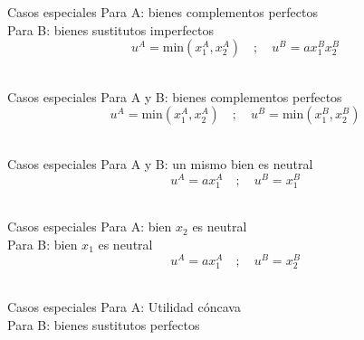 \begin{frame}{Casos especiales}
	Para A: bienes complementos perfectos \\
	Para B: bienes sustitutos imperfectos
		$$u^{A}=\text{min}(x_{1}^{A},x_{2}^{A}) \quad ; \quad u^{B}=ax_{1}^{B}x_{2}^{B}$$\\
			\centering
		
\end{frame}
\begin{frame}{Casos especiales}
	Para A y B: bienes complementos perfectos
	$$u^{A}=\text{min}(x_{1}^{A},x_{2}^{A}) \quad ; \quad u^{B}=\text{min}(x_{1}^{B},x_{2}^{B})$$\\
		\centering
	
\end{frame}
\begin{frame}{Casos especiales}
	Para A y B: un mismo bien es neutral
	$$u^{A}=ax_{1}^{A} \quad ; \quad u^{B}=x_{1}^{B}$$\\
	\vspace{3cm}
		
\end{frame}
\begin{frame}{Casos especiales}
	Para A: bien $x_2$ es neutral \\
	Para B: bien $x_1$ es neutral
	$$u^{A}=ax_{1}^{A} \quad ; \quad u^{B}=x_{2}^{B}$$\\
		\vspace{3cm}
	
\end{frame}
\begin{frame}{Casos especiales}
	Para A: Utilidad cóncava \\
	Para B: bienes sustitutos perfectos\\
		\vspace{3cm}
	
\end{frame}